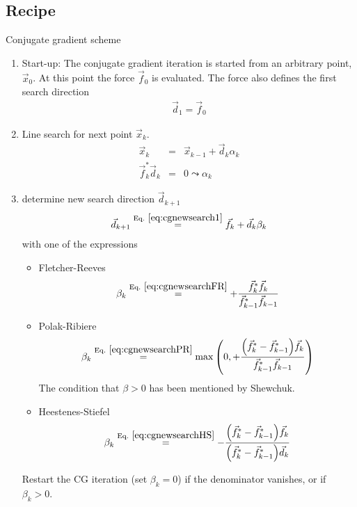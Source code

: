 \documentclass[11pt,a4paper]{report}
\begin{document}
\subsection{Recipe}
\begin{myshadowminipage}{Conjugate gradient scheme}
\begin{enumerate}
\item Start-up: The conjugate gradient iteration is started from an
  arbitrary point, $\vec{x}_0$. At this point the force $\vec{f}_0$ is
  evaluated. The force also defines the first search direction
\begin{eqnarray}
\vec{d}_1=\vec{f}_0
\end{eqnarray}
%
\item Line search for next point $\vec{x}_k$.
\begin{eqnarray}
\vec{x}_k&=&\vec{x}_{k-1}+\vec{d}_k\alpha_k
\label{eq:cgfinalxkwithalphaka}
\\
\vec{f}_k^*\vec{d}_k&=&0\leadsto\alpha_k
\label{eq:cgfinalxkwithalphakb}
\end{eqnarray}
%
\item determine new search direction $\vec{d}_{k+1}$
\begin{eqnarray}
\vec{d}_{k+1}\eqrel{eq:cgnewsearch1}{=}\vec{f}_k+\vec{d}_k\beta_k
\end{eqnarray}
with one of the expressions
\begin{itemize}
\item Fletcher-Reeves
\begin{eqnarray}
\beta_k\eqrel{eq:cgnewsearchFR}{=}
+\frac{\vec{f}_k^*\vec{f}_k}
{\vec{f}_{k-1}^*\vec{f}_{k-1}}
\label{eq:cgfinalnewsearchFR}
\end{eqnarray}
\item Polak-Ribiere
\begin{eqnarray}
\beta_k\eqrel{eq:cgnewsearchPR}{=}
\max\left(0,
+\frac{\Bigl(\vec{f}_k^*-\vec{f}_{k-1}^*\Bigr)\vec{f}_k}
{\vec{f}_{k-1}^*\vec{f}_{k-1}}\right)
\label{eq:cgfinalnewsearchPR}
\end{eqnarray}
The condition that $\beta>0$ has been mentioned by
Shewchuk\cite{shewchuk94_url}.


\item Heestenes-Stiefel
\begin{eqnarray}
\beta_k\eqrel{eq:cgnewsearchHS}{=}
-\frac{\Bigl(\vec{f}_k^*-\vec{f}_{k-1}^*\Bigr)\vec{f}_k}
{\Bigl(\vec{f}_k^*-\vec{f}_{k-1}^*\Bigr)\vec{d}_k}
\label{eq:cgfinalnewsearchHS}
\end{eqnarray}
\end{itemize}
Restart the CG iteration (set $\beta_k=0$) if the denominator
vanishes, or if $\beta_k>0$.
\end{enumerate}
\end{myshadowminipage}


\printindex
\clearpage
 
 
\end{document}
